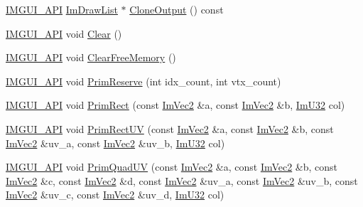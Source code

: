 \begin{DoxyCompactItemize}
\item 
\mbox{\hyperlink{imgui_8h_a43829975e84e45d1149597467a14bbf5}{I\+M\+G\+U\+I\+\_\+\+A\+PI}} \mbox{\hyperlink{struct_im_draw_list}{Im\+Draw\+List}} $\ast$ \mbox{\hyperlink{struct_im_draw_list_a24c853c3976c77e7b361fab39adde686}{Clone\+Output}} () const
\item 
\mbox{\hyperlink{imgui_8h_a43829975e84e45d1149597467a14bbf5}{I\+M\+G\+U\+I\+\_\+\+A\+PI}} void \mbox{\hyperlink{struct_im_draw_list_ac422590c71dc5593aea52f65793aee81}{Clear}} ()
\item 
\mbox{\hyperlink{imgui_8h_a43829975e84e45d1149597467a14bbf5}{I\+M\+G\+U\+I\+\_\+\+A\+PI}} void \mbox{\hyperlink{struct_im_draw_list_a8b2686e006f57c554b709dfc47e2ad63}{Clear\+Free\+Memory}} ()
\item 
\mbox{\hyperlink{imgui_8h_a43829975e84e45d1149597467a14bbf5}{I\+M\+G\+U\+I\+\_\+\+A\+PI}} void \mbox{\hyperlink{struct_im_draw_list_a879aa38dbfb0344e3e023d65c002c7d7}{Prim\+Reserve}} (int idx\+\_\+count, int vtx\+\_\+count)
\item 
\mbox{\hyperlink{imgui_8h_a43829975e84e45d1149597467a14bbf5}{I\+M\+G\+U\+I\+\_\+\+A\+PI}} void \mbox{\hyperlink{struct_im_draw_list_ae2be093563f1d20b8190b7c423113925}{Prim\+Rect}} (const \mbox{\hyperlink{struct_im_vec2}{Im\+Vec2}} \&a, const \mbox{\hyperlink{struct_im_vec2}{Im\+Vec2}} \&b, \mbox{\hyperlink{imgui_8h_a118cff4eeb8d00e7d07ce3d6460eed36}{Im\+U32}} col)
\item 
\mbox{\hyperlink{imgui_8h_a43829975e84e45d1149597467a14bbf5}{I\+M\+G\+U\+I\+\_\+\+A\+PI}} void \mbox{\hyperlink{struct_im_draw_list_a77d48ed5b33ccdd908824c0a3bebfff8}{Prim\+Rect\+UV}} (const \mbox{\hyperlink{struct_im_vec2}{Im\+Vec2}} \&a, const \mbox{\hyperlink{struct_im_vec2}{Im\+Vec2}} \&b, const \mbox{\hyperlink{struct_im_vec2}{Im\+Vec2}} \&uv\+\_\+a, const \mbox{\hyperlink{struct_im_vec2}{Im\+Vec2}} \&uv\+\_\+b, \mbox{\hyperlink{imgui_8h_a118cff4eeb8d00e7d07ce3d6460eed36}{Im\+U32}} col)
\item 
\mbox{\hyperlink{imgui_8h_a43829975e84e45d1149597467a14bbf5}{I\+M\+G\+U\+I\+\_\+\+A\+PI}} void \mbox{\hyperlink{struct_im_draw_list_a9df27414aaca5f34ac3664a8b82582b5}{Prim\+Quad\+UV}} (const \mbox{\hyperlink{struct_im_vec2}{Im\+Vec2}} \&a, const \mbox{\hyperlink{struct_im_vec2}{Im\+Vec2}} \&b, const \mbox{\hyperlink{struct_im_vec2}{Im\+Vec2}} \&c, const \mbox{\hyperlink{struct_im_vec2}{Im\+Vec2}} \&d, const \mbox{\hyperlink{struct_im_vec2}{Im\+Vec2}} \&uv\+\_\+a, const \mbox{\hyperlink{struct_im_vec2}{Im\+Vec2}} \&uv\+\_\+b, const \mbox{\hyperlink{struct_im_vec2}{Im\+Vec2}} \&uv\+\_\+c, const \mbox{\hyperlink{struct_im_vec2}{Im\+Vec2}} \&uv\+\_\+d, \mbox{\hyperlink{imgui_8h_a118cff4eeb8d00e7d07ce3d6460eed36}{Im\+U32}} col)

\end{DoxyCompactItemize}
